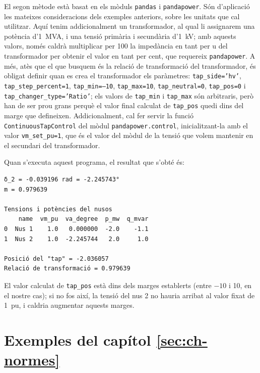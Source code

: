 El segon mètode està basat en els mòduls \texttt{pandas} i \texttt{pandapower}. Són d'aplicació les mateixes consideracions dels exemples anteriors, sobre les unitats que cal utilitzar. Aquí tenim addicionalment un transformador, al qual li assignarem una potència d'\qty{1}{MVA}, i una tensió primària i secundària d'\qty{1}{kV}; amb aquests valors, només caldrà multiplicar per 100 la impedància en tant per u  del transformador per obtenir el valor en tant per cent, que requereix \texttt{pandapower}. A més, atès que el que busquem és la relació de transformació del transformador, és obligat definir quan es crea el transformador els paràmetres: \texttt{tap\_side='hv'}, \texttt{tap\_step\_percent=1}, \texttt{tap\_min=--10}, \texttt{tap\_max=10}, \texttt{tap\_neutral=0},   \texttt{tap\_pos=0} i \texttt{tap\_changer\_type='Ratio'}; els valors de \texttt{tap\_min} i \texttt{tap\_max} són arbitraris, però han de ser prou grans perquè el valor final calculat de \texttt{tap\_pos} quedi dins del marge que defineixen. Addicionalment, cal fer servir la funció \texttt{ContinuousTapControl} del mòdul \texttt{pandapower.control}, inicialitzant-la amb el valor \texttt{vm\_set\_pu=1}, que és el valor del mòdul de la tensió que volem mantenir en el secundari del transformador.




Quan s'executa aquest programa, el resultat que s'obté és:
\lstset{
	language=,
	numbers=none,
	frame=none
}
\begin{lstlisting}
δ_2 = -0.039196 rad = -2.245743°
m = 0.979639

Tensions i potències del nusos
    name  vm_pu  va_degree  p_mw  q_mvar
0  Nus 1    1.0   0.000000  -2.0    -1.1
1  Nus 2    1.0  -2.245744   2.0     1.0

Posició del "tap" = -2.036057
Relació de transformació = 0.979639
\end{lstlisting}

El valor calculat de \texttt{tap\_pos} està dins dels marges establerts (entre $-10$ i 10, en el nostre cas); si no fos així, la tensió del nus 2 no hauria arribat al valor fixat de \qty{1}{pu}, i caldria augmentar aquests marges.




\section{Exemples del capítol \ref*{sec:ch-normes}}


